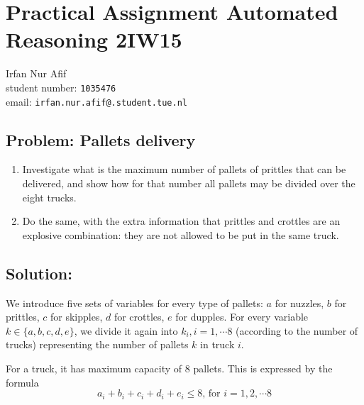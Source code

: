 \documentclass[12pt]{article}
\begin{document}
\section*{Practical
Assignment Automated Reasoning 2IW15 }

\begin{center}
Irfan Nur Afif \\
student number: {\tt 1035476}\\
email: {\tt irfan.nur.afif@.student.tue.nl}
\end{center}

\vspace{8mm}

\subsection*{Problem: Pallets delivery}

\begin{enumerate}
	\item Investigate what is the maximum number of pallets of prittles that can be delivered,
	and show how for that number all pallets may be divided over the eight trucks.
	\item Do the same, with the extra information that prittles and crottles are an explosive combination: they are not allowed to be put in the same truck.
\end{enumerate}
 

\vspace{8mm}

\subsection*{Solution:}

We introduce five sets of variables for every type of pallets: $a$ for nuzzles, $b$ for prittles,  $c$ for skipples, $d$ for crottles, $e$ for dupples. For every variable $k \in\{a,b,c,d,e\}$, we divide it again into $k_i, i=1, \cdots 8$ (according to the number of trucks) representing the number of pallets $k$ in truck $i$.

For a truck, it has maximum capacity of 8 pallets. This is expressed by the formula
\[a_i + b_i + c_i + d_i + e_i \leq 8  \text{, for }  i=1,2,\cdots 8 \]
\end{document}
